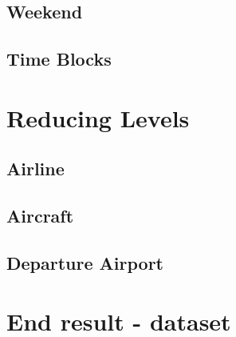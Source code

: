 \subsection{Weekend}
\subsection{Time Blocks}

\section{Reducing Levels}
\subsection{Airline}
\subsection{Aircraft}
\subsection{Departure Airport}

\section{End result - dataset}